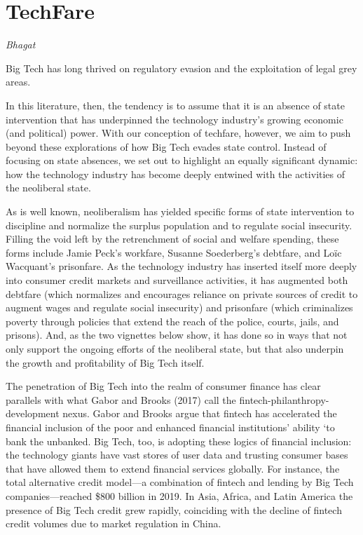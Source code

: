 \documentclass[
]{book}
\begin{document}
\hypertarget{techfare}{%
\section{TechFare}\label{techfare}}

\emph{Bhagat}

Big Tech has long thrived on regulatory evasion and the exploitation of legal grey areas.

In this literature, then, the tendency is to assume that it is an absence of state intervention that has underpinned the technology industry's growing economic (and political) power. With our conception of techfare, however, we aim to push beyond these explorations of how Big Tech evades state control. Instead of focusing on state absences, we set out to highlight an equally significant dynamic: how the technology industry has become deeply entwined with the activities of the neoliberal state.

As is well known, neoliberalism has yielded specific forms of state intervention to discipline and normalize the surplus population and to regulate social insecurity. Filling the void left by the retrenchment of social and welfare spending, these forms include Jamie Peck's workfare, Susanne Soederberg's debtfare, and Loïc Wacquant's prisonfare. As the technology industry has inserted itself more deeply into consumer credit markets and surveillance activities, it has augmented both debtfare (which normalizes and encourages reliance on private sources of credit to augment wages and regulate social insecurity) and prisonfare (which criminalizes poverty through policies that extend the reach of the police, courts, jails, and prisons). And, as the two vignettes below show, it has done so in ways that not only support the ongoing efforts of the neoliberal state, but that also underpin the growth and profitability of Big Tech itself.

The penetration of Big Tech into the realm of consumer finance has clear parallels with what Gabor and Brooks (2017) call the fintech-philanthropy-development nexus. Gabor and Brooks argue that fintech has accelerated the financial inclusion of the poor and enhanced financial institutions' ability `to bank the unbanked. Big Tech, too, is adopting these logics of financial inclusion: the technology giants have vast stores of user data and trusting consumer bases that have allowed them to extend financial services globally. For instance, the total alternative credit model---a combination of fintech and lending by Big Tech companies---reached \$800 billion in 2019. In Asia, Africa, and Latin America the presence of Big Tech credit grew rapidly, coinciding with the decline of fintech credit volumes due to market regulation in China.
\end{document}
